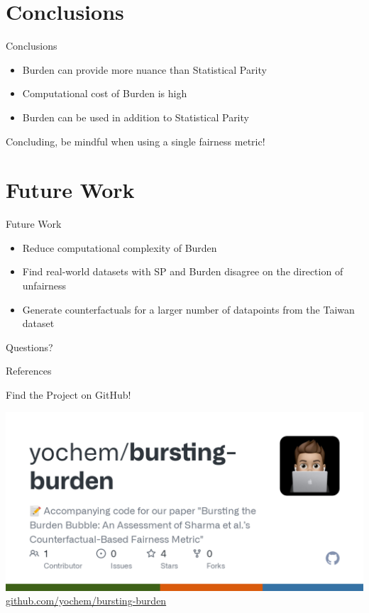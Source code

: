 \documentclass[aspectratio=169]{beamer}
\begin{document}
\section{Conclusions}

\begin{frame}{Conclusions}
    \begin{itemize}
        \item Burden can provide more nuance than Statistical Parity
        \item Computational cost of Burden is high
        \item Burden can be used in addition to Statistical Parity
    \end{itemize}

    \vspace{1cm}
    \begin{center}
    {\large\alert{Concluding, be mindful when using a single fairness metric!}}
    \end{center}
\end{frame}

\section{Future Work}
\begin{frame}{Future Work}
    \begin{itemize}
        \item Reduce computational complexity of Burden
        \item Find real-world datasets with SP and Burden disagree on the direction of unfairness
        \item Generate counterfactuals for a larger number of datapoints from the Taiwan dataset
    \end{itemize} 
\end{frame}

\appendix

\begin{frame}[standout]
  Questions?
\end{frame}

\begin{frame}[allowframebreaks]{References}

  
  

\end{frame}


\begin{frame}{Find the Project on GitHub!}

\begin{center}
    \includegraphics[width=.6\textwidth]{img/github.png}
    \vspace{1cm}
    \alert{
    \href{https://github.com/yochem/bursting-burden}{github.com/yochem/bursting-burden}
    }
\end{center}
\end{frame}
\end{document}
